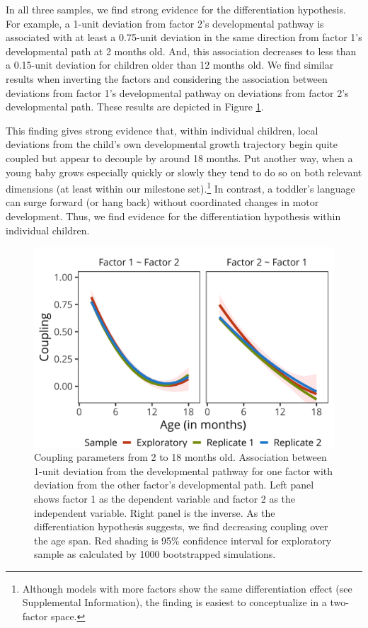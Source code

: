 \documentclass[man, floatsintext]{apa7}
\begin{document}
In all
three samples, we find strong evidence for the differentiation
hypothesis. For example, a 1-unit deviation from factor 2's
developmental pathway is associated with at least a 0.75-unit deviation
in the same direction from factor 1's developmental path at 2 months
old. And, this association decreases to less than a 0.15-unit deviation
for children older than 12 months old. We find similar results when
inverting the factors and considering the association between deviations
from factor 1's developmental pathway on deviations from factor 2's
developmental path. These results are depicted in Figure
\ref{fig:study2results}. 

This finding gives strong evidence that, within individual children, local deviations from the child's own developmental growth trajectory begin quite coupled but appear to decouple by around 18 months. Put another way, when a young baby grows especially quickly or slowly they tend to do so on both relevant dimensions (at least within our milestone set).\footnote{Although models with more factors show the same differentiation effect (see Supplemental Information), the finding is easiest to conceptualize in a two-factor space.} In contrast, a toddler's language can surge forward (or hang back) without coordinated changes in motor development. Thus, we find evidence for the differentiation hypothesis within individual children.

\begin{figure}
\centering
\includegraphics[width=.75\columnwidth]{figures/study2results.png}
\caption{Coupling parameters from 2 to 18 months old. Association between 1-unit deviation from the developmental pathway for one factor with deviation from the other factor’s developmental path. Left panel shows factor 1 as the dependent variable and factor 2 as the independent variable. Right panel is the inverse. As the differentiation hypothesis suggests, we find decreasing coupling over the age span. Red shading is 95\% confidence interval for exploratory sample as calculated by 1000 bootstrapped simulations.}
\label{fig:study2results}
\end{figure}
\end{document}
